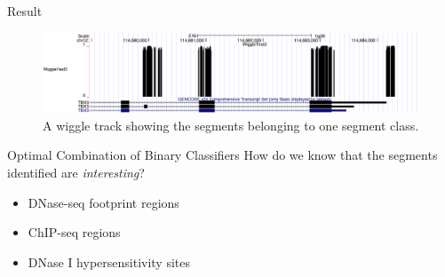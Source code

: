 \documentclass{beamer}
\begin{document}
    \begin{frame}{Result}
        \begin{figure}
            \centering
            \includegraphics[width=\textwidth]{WiggleTrack1.pdf}
            \caption{A wiggle track showing the segments belonging to one segment class.}
            \label{fig:wiggle}
        \end{figure}
    \end{frame}
    
    
    \begin{frame}{Optimal Combination of Binary Classifiers}
        How do we know that the segments identified are \emph{interesting}? 
        
        \begin{itemize}
            \item DNase-seq footprint regions
            \item ChIP-seq regions
            \item DNase I hypersensitivity sites
        \end{itemize}
    \end{frame}
    
        
\end{document}
